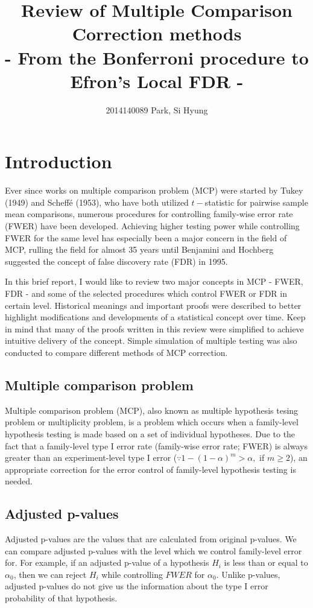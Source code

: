 \documentclass[a4paper, 11pt, oneside]{article}
\title{Review of Multiple Comparison Correction methods\\
	\Large - From the Bonferroni procedure to Efron's Local FDR - }
\author{2014140089 Park, Si Hyung}
\begin{document}
\maketitle

\section{Introduction}
    Ever since works on multiple comparison problem (MCP) were started by Tukey (1949) and Scheff\'e (1953), who have both utilized $t-$statistic for pairwise sample mean comparisons, numerous procedures for controlling family-wise error rate (FWER) have been developed. Achieving higher testing power while controlling FWER for the same level has especially been a major concern in the field of MCP, rulling the field for almost 35 years until Benjamini and Hochberg suggested the concept of false discovery rate (FDR) in 1995. \par
    In this brief report, I would like to review two major concepts in MCP - FWER, FDR - and some of the selected procedures which control FWER or FDR in certain level. Historical meanings and important proofs were described to better highlight modifications and developments of a statistical concept over time. Keep in mind that many of the proofs written in this review were simplified to achieve intuitive delivery of the concept. Simple simulation of multiple testing was also conducted to compare different methods of MCP correction.

\subsection{Multiple comparison problem}
Multiple comparison problem (MCP), also known as multiple hypothesis tesing problem or multiplicity problem, is a problem which occurs when a family-level hypothesis testing is made based on a set of individual hypotheses. Due to the fact that a family-level type I error rate (family-wise error rate; FWER) is always greater than an experiment-level type I error ($\because 1-(1-\alpha)^m > \alpha,$ if $m \geq 2$), an appropriate correction for the error control of family-level hypothesis testing is needed.

\subsection{Adjusted p-values}
Adjusted p-values are the values that are calculated from original p-values. We can compare adjusted p-values with the level which we control family-level error for. For example, if an adjusted p-value of a hypothesis $H_i$ is less than or equal to $\alpha_0$, then we can reject $H_i$ while controlling $FWER$ for $\alpha_0$. Unlike p-values, adjusted p-values do not give us the information about the type I error probability of that hypothesis.
\end{document}
